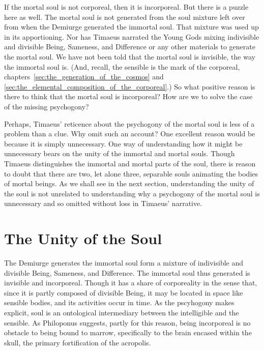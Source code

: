 If the mortal soul is not corporeal, then it is incorporeal. But there is a puzzle here as well. The mortal soul is not generated from the soul mixture left over from when the Demiurge generated the immortal soul. That mixture was used up in its apportioning. Nor has Timaeus narrated the Young Gods mixing indivisible and divisible Being, Sameness, and Difference or any other materials to generate the mortal soul. We have not been told that the mortal soul is invisible, the way the immortal soul is. (And, recall, the sensible is the mark of the corporeal, chapters~\ref{sec:the_generation_of_the_cosmos} and \ref{sec:the_elemental_composition_of_the_corporeal}.) So what positive reason is there to think that the mortal soul is incorporeal? How are we to solve the case of the missing psychogony?

Perhaps, Timaeus' reticence about the psychogony of the mortal soul is less of a problem than a clue. Why omit such an account? One excellent reason would be because it is simply unnecessary. One way of understanding how it might be unnecessary bears on the unity of the immortal and mortal souls. Though Timaeus distinguishes the immortal and mortal parts of the soul, there is reason to doubt that there are two, let alone three, separable souls animating the bodies of mortal beings. As we shall see in the next section, understanding the unity of the soul is not unrelated to understanding why a psychogony of the mortal soul is unnecessary and so omitted without loss in Timaeus' narrative.


\section{The Unity of the Soul} %
\label{sec:the_unity_of_the_soul}

The Demiurge generates the immortal soul form a mixture of indivisible and divisible Being, Sameness, and Difference. The immortal soul thus generated is invisible and incorporeal. Though it has a share of corporeality in the sense that, since it is partly composed of divisible Being, it may be located in space like sensible bodies, and its activities occur in time. As the pscyhogony makes explicit, soul is an ontological intermediary between the intelligible and the sensible. As Philoponus suggests, partly for this reason, being incorporeal is no obstacle to being bound to marrow, specifically to the brain encased within the skull, the primary fortification of the acropolis.

